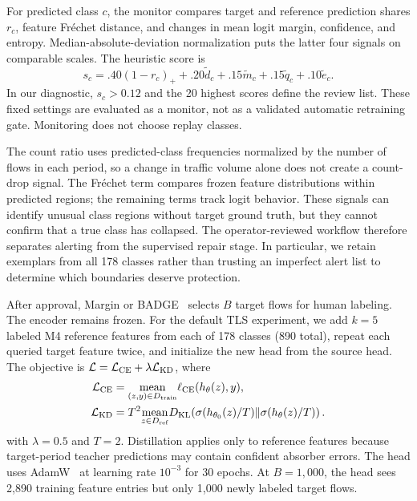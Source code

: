 \documentclass[journal]{IEEEtran}
\begin{document}
For predicted class $c$, the monitor compares target and reference prediction shares $r_c$, feature Fr\'echet distance, and changes in mean logit margin, confidence, and entropy. Median-absolute-deviation normalization puts the latter four signals on comparable scales. The heuristic score is
\begin{equation}
s_c=.40(1-r_c)_+ + .20\tilde d_c+
.15\tilde m_c+.15\tilde q_c+.10\tilde e_c .
\end{equation}
In our diagnostic, $s_c>0.12$ and the 20 highest scores define the review list. These fixed settings are evaluated as a monitor, not as a validated automatic retraining gate. Monitoring does not choose replay classes.

The count ratio uses predicted-class frequencies normalized by the number of flows in each period, so a change in traffic volume alone does not create a count-drop signal. The Fr\'echet term compares frozen feature distributions within predicted regions; the remaining terms track logit behavior. These signals can identify unusual class regions without target ground truth, but they cannot confirm that a true class has collapsed. The operator-reviewed workflow therefore separates alerting from the supervised repair stage. In particular, we retain exemplars from all 178 classes rather than trusting an imperfect alert list to determine which boundaries deserve protection.

After approval, Margin or BADGE~\cite{ash2020badge} selects $B$ target flows for human labeling. The encoder remains frozen. For the default TLS experiment, we add $k=5$ labeled M4 reference features from each of 178 classes (890 total), repeat each queried target feature twice, and initialize the new head from the source head. The objective is $\mathcal L=\mathcal L_{\rm CE}+\lambda\mathcal L_{\rm KD}$, where
\begin{align}
\mathcal L_{\rm CE}
&=\underset{(z,y)\in D_{\rm train}}{\operatorname{mean}}
\ell_{\rm CE}(h_\theta(z),y), \nonumber\\
\mathcal L_{\rm KD}
&=T^2\underset{z\in D_{\rm ref}}{\operatorname{mean}}
D_{\rm KL}\!\left(
\sigma(h_{\theta_0}(z)/T)\Vert
\sigma(h_\theta(z)/T)\right).
\label{eq:loss}
\end{align}
with $\lambda=0.5$ and $T=2$. Distillation applies only to reference features because target-period teacher predictions may contain confident absorber errors. The head uses AdamW~\cite{loshchilov2019adamw} at learning rate $10^{-3}$ for 30 epochs. At $B=1{,}000$, the head sees 2,890 training feature entries but only 1,000 newly labeled target flows.
\end{document}
